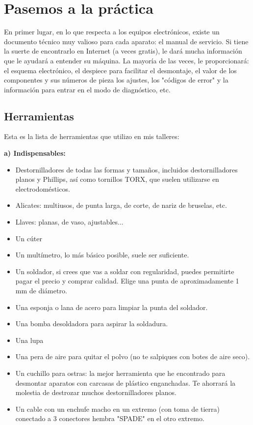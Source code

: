 \chapter{Pasemos a la práctica}
En primer lugar, en lo que respecta a los equipos electrónicos, existe un documento técnico muy valioso para cada aparato: el manual de servicio.
Si tiene la suerte de encontrarlo en Internet (a veces gratis), le dará mucha información que le ayudará a entender su máquina.
La mayoría de las veces, le proporcionará: el esquema electrónico, el despiece
para facilitar el desmontaje, el valor de los componentes y sus números de pieza
los ajustes, los "códigos de error" y la información para entrar en el modo de diagnóstico, etc.

\section{Herramientas}
Esta es la lista de herramientas que utilizo en mis talleres:

{\large \textbf{a) Indispensables:}}
\begin{itemize}[label=\CheckmarkBold]
\setlength\itemsep{0em} %
\item Destornilladores de todas las formas y tamaños, incluidos destornilladores planos y Phillips, así como tornillos TORX, que suelen utilizarse en electrodomésticos. 
\item Alicates: multiusos, de punta larga, de corte, de nariz de bruselas, etc. 
\item Llaves: planas, de vaso, ajustables... 
\item Un cúter 
\item Un multímetro, lo más básico posible, suele ser suficiente.
\item Un soldador, si crees que vas a soldar con regularidad, puedes permitirte pagar el precio y comprar calidad. Elige una punta de aproximadamente 1 mm de diámetro. 
\item Una esponja o lana de acero para limpiar la punta del soldador.
\item Una bomba desoldadora para aspirar la soldadura.
\item Una lupa
\item Una pera de aire para quitar el polvo (no te salpiques con botes de aire seco).
\item Un cuchillo para ostras: la mejor herramienta que he encontrado para desmontar aparatos con carcasas de plástico enganchadas. Te ahorrará la molestia de destrozar muchos destornilladores planos.
\item Un cable con un enchufe macho en un extremo (con toma de tierra) conectado a 3 conectores hembra "SPADE" en el otro extremo.\\
\end{itemize}


